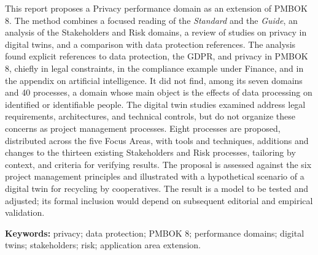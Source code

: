 \documentclass[12pt,a4paper,article,oneside,brazil,english]{abntex2}
\begin{document}
\begin{resumo}[Abstract]
This report proposes a Privacy performance domain as an extension of PMBOK 8. The method combines a focused reading of the \textit{Standard} and the \textit{Guide}, an analysis of the Stakeholders and Risk domains, a review of studies on privacy in digital twins, and a comparison with data protection references. The analysis found explicit references to data protection, the GDPR, and privacy in PMBOK 8, chiefly in legal constraints, in the compliance example under Finance, and in the appendix on artificial intelligence. It did not find, among its seven domains and 40 processes, a domain whose main object is the effects of data processing on identified or identifiable people. The digital twin studies examined address legal requirements, architectures, and technical controls, but do not organize these concerns as project management processes. Eight processes are proposed, distributed across the five Focus Areas, with tools and techniques, additions and changes to the thirteen existing Stakeholders and Risk processes, tailoring by context, and criteria for verifying results. The proposal is assessed against the six project management principles and illustrated with a hypothetical scenario of a digital twin for recycling by cooperatives. The result is a model to be tested and adjusted; its formal inclusion would depend on subsequent editorial and empirical validation.

\vspace{\onelineskip}
\noindent\textbf{Keywords:} privacy; data protection; PMBOK 8; performance domains; digital twins; stakeholders; risk; application area extension.
\end{resumo}
\end{document}
